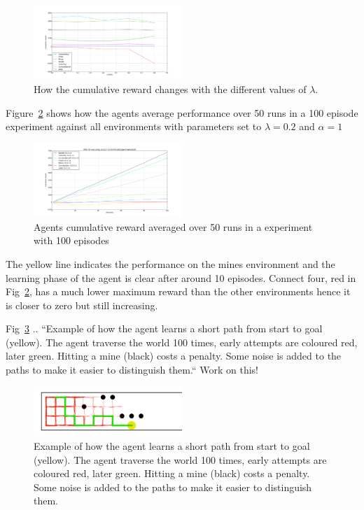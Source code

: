 \begin{figure}[h]
    \centering
    \includegraphics[width=0.5\textwidth]{../data/lambdasweepplot.png}
    \caption{How the cumulative reward changes with the different values of $\lambda$.}
    \label{fig:awesome_image}
\end{figure}
Figure~\ref{fig:cumreward} shows how the agents average performance over 50 runs
in a 100 episode experiment against all environments with parameters set to
$\lambda = 0.2$ and $\alpha = 1$

\begin{figure}[h!]
    \centering
    \includegraphics[width=0.5\textwidth]{../data/100episodes_50runs.png}
    \caption{Agents cumulative reward averaged over 50 runs in a experiment with 100 episodes}
    \label{fig:cumreward}
\end{figure} 
The yellow line indicates the performance on the mines environment and the
learning phase of the agent is clear after around 10 episodes. Connect four, red
in Fig~\ref{fig:cumreward}, has a much lower maximum reward than the other
environments hence it is closer to zero but still increasing.

Fig~\ref{fig:mineslearning} .. ``Example of how the agent learns a short path from start to goal (yellow). The agent traverse the world 100 times, early attempts are coloured red, later green. Hitting a mine (black) costs a penalty. Some noise is added to the paths to make it easier to distinguish them.``
Work on this!

\begin{figure}[h]
    \centering
    \includegraphics[width=0.5\textwidth]{../data/minPlot.png}
    \caption{Example of how the agent learns a short path from start to goal (yellow). The agent traverse the world 100 times, early attempts are coloured red, later green. Hitting a mine (black) costs a penalty. Some noise is added to the paths to make it easier to distinguish them.}
    \label{fig:mineslearning}
\end{figure} 


